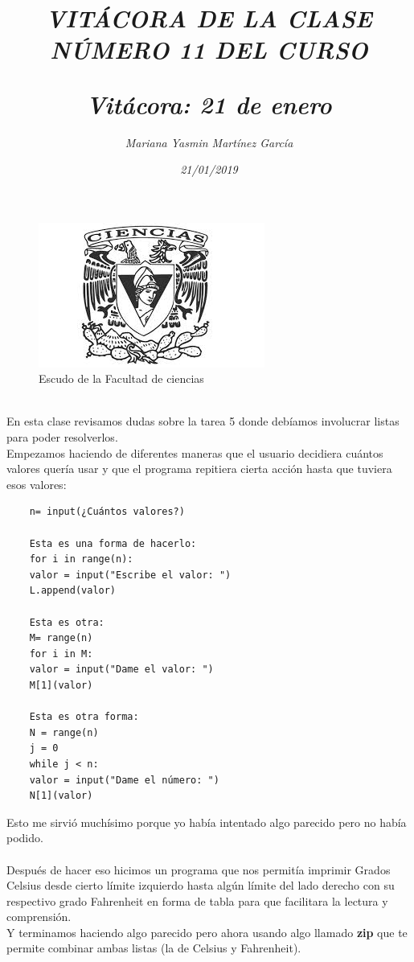 \documentclass{article}
\title{\Huge\item\color{purple}\textit{VITÁCORA DE LA CLASE NÚMERO 11 DEL CURSO}}
\author{\Large\textit{ Mariana Yasmin Martínez García}}
\date{\Large\textit{ 21/01/2019}}
\begin{document}
\begin{figure}[t]
	\centering
	\includegraphics[width=0.8\linewidth]{Imagenes/1}
	\caption{Escudo de la Facultad de ciencias}
	\label{fig:1}
\end{figure}
	\maketitle
		
	\newpage
	
	\title{\Huge\textbf{\color{purple}\textit{Vitácora: 21 de enero\\}}} \\
	En esta clase revisamos dudas sobre la tarea 5 donde debíamos involucrar listas para poder resolverlos. \\
	Empezamos haciendo de diferentes maneras que el usuario decidiera cuántos valores quería usar y que el programa repitiera cierta acción hasta que tuviera esos valores:
	\begin{verbatim}
	n= input(¿Cuántos valores?)
	
	Esta es una forma de hacerlo:
	for i in range(n):
	valor = input("Escribe el valor: ")
	L.append(valor)
	
	Esta es otra:
	M= range(n)
	for i in M:
	valor = input("Dame el valor: ")
	M[1](valor)
	
	Esta es otra forma:
	N = range(n)
	j = 0
	while j < n:
	valor = input("Dame el número: ")
	N[1](valor)
	\end{verbatim}
Esto me sirvió muchísimo porque yo había intentado algo parecido pero no había podido. \\ \\
Después de hacer eso hicimos un programa que nos permitía imprimir Grados Celsius desde cierto límite izquierdo hasta algún límite del lado derecho con su respectivo grado Fahrenheit en forma de tabla para que facilitara la lectura y comprensión. \\
Y terminamos haciendo algo parecido pero ahora usando algo llamado \textbf{zip} que te permite combinar ambas listas (la de Celsius y Fahrenheit).
\end{document}
